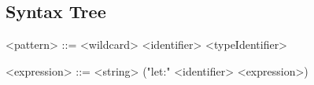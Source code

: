 \documentclass{report}
\begin{document}
\subsection{Syntax Tree}

\setlength{\grammarparsep}{20pt plus 1pt minus 1pt} %
\setlength{\grammarindent}{12em} %

\begin{grammar}
<pattern> ::= <wildcard>
          \alt <identifier>
          \alt <typeIdentifier>

<expression> ::= <string>
             \alt ("let:" <identifier> <expression>)
\end{grammar}
\end{document}
